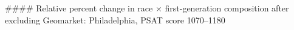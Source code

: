 #### Relative percent change in race × first-generation composition after excluding Geomarket: Philadelphia, PSAT score 1070–1180
